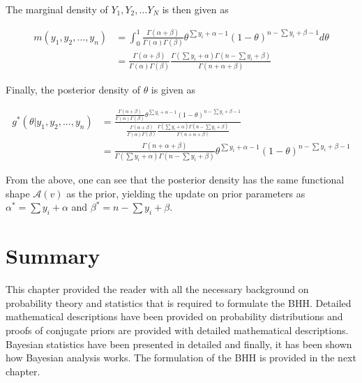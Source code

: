 The marginal density of $Y_{1}, Y_{2}, \dots Y_{N}$ is then given as

\begin{equation*}
      \begin{split}
            m(y_{1}, y_{2}, \dots, y_{n})
            &= \int_{0}^{1}\frac{\Gamma(\alpha + \beta)}{\Gamma(\alpha)\Gamma(\beta)}\theta^{\sum y_{i} + \alpha - 1}(1-\theta)^{n - \sum y_{i} + \beta - 1}d\theta\\
            &= \frac{\Gamma(\alpha + \beta)}{\Gamma(\alpha)\Gamma(\beta)}\frac{\Gamma(\sum y_{i} + \alpha)\Gamma(n - \sum y_{i} + \beta)}{\Gamma(n + \alpha + \beta)}
      \end{split}
\end{equation*}

Finally, the posterior density of $\theta$ is given as

\begin{equation*}
      \begin{split}
            g^{*}(\theta \vert y_{1}, y_{2}, \dots, y_{n})
            &= \frac{\frac{\Gamma(\alpha + \beta)}{\Gamma(\alpha)\Gamma(\beta)}\theta^{\sum y_{i} + \alpha - 1}(1-\theta)^{n - \sum y_{i} + \beta - 1}}{\frac{\Gamma(\alpha + \beta)}{\Gamma(\alpha)\Gamma(\beta)}\frac{\Gamma(\sum y_{i} + \alpha)\Gamma(n - \sum y_{i} + \beta)}{\Gamma(n + \alpha + \beta)}}\\
            &= \frac{\Gamma(n + \alpha + \beta)}{\Gamma(\sum y_{i} + \alpha)\Gamma(n - \sum y_{i} + \beta)}\theta^{\sum y_{i} + \alpha - 1}(1-\theta)^{n - \sum y_{i} + \beta - 1}
      \end{split}
\end{equation*}

From the above, one can see that the posterior density has the same functional shape $\mathcal{A}(v)$ as the prior, yielding the update on prior parameters as $\alpha^{*} = \sum y_{i} + \alpha$ and $\beta^{*} = n - \sum y_{i} + \beta$.

\section{Summary}
\label{sec:probability:summary}

This chapter provided the reader with all the necessary background on probability theory and statistics that is required to formulate the \ac{BHH}. Detailed mathematical descriptions have been provided on probability distributions and proofs of conjugate priors are provided with detailed mathematical descriptions. Bayesian statistics have been presented in detailed and finally, it has been shown how Bayesian analysis works. The formulation of the \ac{BHH} is provided in the next chapter.